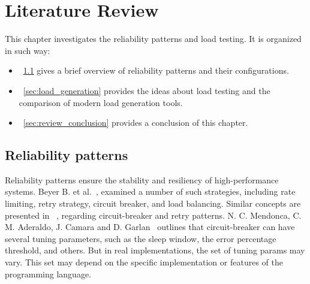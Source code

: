 \chapter{Literature Review}
\label{ch:lr}

This chapter investigates the reliability patterns and load testing.
It is organized in such way:
\begin{itemize}
    \item~\ref{sec:reliability} gives a brief overview of reliability patterns and their configurations.
    \item~\ref{sec:load_generation} provides the ideas about load testing and the comparison of modern load generation tools.
    \item~\ref{sec:review_conclusion} provides a conclusion of this chapter.
\end{itemize}


\section{Reliability patterns}\label{sec:reliability}
Reliability patterns ensure the stability and resiliency of high-performance systems.
Beyer B. et al.~\cite{google_sre}, examined a number of such strategies, including rate limiting, retry strategy, circuit breaker, and load balancing. Similar concepts are presented in ~\cite{reliability_patterns}, regarding circuit-breaker and retry patterns.
N. C. Mendonca, C. M. Aderaldo, J. Camara and D. Garlan~\cite{circuit_breaker} outlines that circuit-breaker can have several tuning parameters, such as the sleep window, the error percentage threshold, and others. But in real implementations, the set of tuning params may vary. This set may depend on the specific implementation or features of the programming language.

